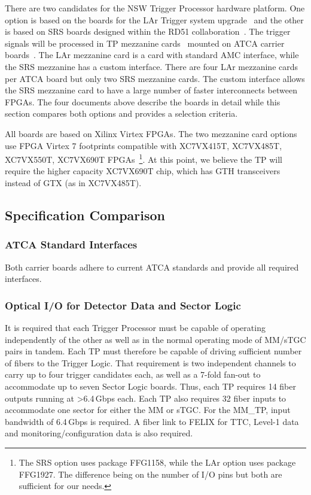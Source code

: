 There are two candidates for the NSW Trigger Processor hardware platform.
One option is based on the boards for the \PhaseOne LAr Trigger system upgrade~\cite{hardware-LAr-Carrier,hardware-LAr-OTC} and the other is based on SRS boards designed within the RD51 collaboration~\cite{hardware-SRS-Carrier,hardware-SRS-Mezz}.
The trigger signals will be processed in TP mezzanine cards~\cite{hardware-LAr-OTC,hardware-SRS-Mezz}
mounted on ATCA carrier boards~\cite{hardware-LAr-Carrier,hardware-SRS-Carrier}. The LAr mezzanine card is a card with standard AMC interface, while the SRS mezzanine has a custom interface.
There are four LAr mezzanine cards per ATCA board but only two SRS mezzanine cards.
The custom interface allows the SRS mezzanine card to have a large number of faster interconnects between FPGAs.
The four documents above describe the boards in detail while this
section compares both options and provides a selection criteria.

All boards are based on Xilinx Virtex FPGAs. The two mezzanine card options use FPGA
Virtex 7 footprints compatible with XC7VX415T, XC7VX485T, XC7VX550T, XC7VX690T FPGAs~\footnote{The SRS option uses package FFG1158, while the LAr option uses package FFG1927. The difference being on the number of I/O pins but both are sufficient for our needs.}.
At this point, we believe the TP will require the higher capacity XC7VX690T chip, which has GTH transceivers instead of GTX (as in XC7VX485T).


\subsection{Specification Comparison}

\subsubsection{ATCA Standard Interfaces}
\label{atca-standard-interfaces}

Both carrier boards adhere to current ATCA standards and provide all required
interfaces.


\subsubsection{Optical I/O for Detector Data and Sector Logic}
\label{optical-io-for-detector-data-and-sector-logic}

It is required that each Trigger Processor must be capable of operating
independently of the other as well as in the normal operating mode of
MM/sTGC pairs in tandem. Each TP must therefore be capable of driving
sufficient number of fibers to the Trigger Logic. That requirement is
two independent channels to carry up to four trigger candidates each, as
well as a 7-fold fan-out to accommodate up to seven Sector Logic boards. Thus,
each TP requires 14 fiber outputs running at \textgreater{}6.4\,Gbps
each. Each TP also requires 32 fiber inputs to accommodate one sector
for either the MM or sTGC. For the MM\_TP, input bandwidth of 6.4\,Gbps
is required. A fiber link to FELIX for TTC, Level-1 data and
monitoring/configuration data is also required.

